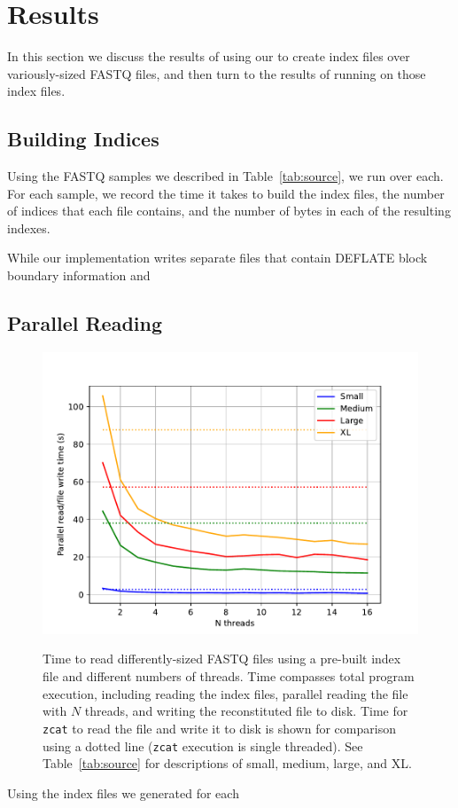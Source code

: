 \section{Results}
\label{sec:results}

In this section we discuss the results of using our \ibuilder to create index
files over variously-sized \gzip FASTQ files, and then turn to the results of
running \ireader on those index files.

\subsection{Building Indices}
\label{sec:buildresults}


Using the \gzip FASTQ samples we described in Table~\ref{tab:source}, we run
\ibuilder over each. For each sample, we record the time it takes to build the
index files, the number of indices that each file contains, and the number of
bytes in each of the resulting indexes. 

While our \ibuilder implementation
writes separate files that contain \gzip DEFLATE block boundary information and



\subsection{Parallel Reading}
\label{sec:readresults}

\begin{figure}[h]
    \includegraphics[width=\linewidth]{figs/cores.pdf}
    \label{fig:cores}
    \caption{Time to read differently-sized FASTQ \gzip files using a pre-built
    index file and different numbers of threads. Time compasses total program
    execution, including reading the index files, parallel reading the \gzip
    file with $N$ threads, and writing the reconstituted file to disk. Time for
    \texttt{zcat} to read the file and write it to disk is shown for comparison
    using a dotted line (\texttt{zcat} execution is single threaded). See
    Table~\ref{tab:source} for descriptions of small, medium, large, and XL.}
\end{figure}

Using the index files we generated for each 


